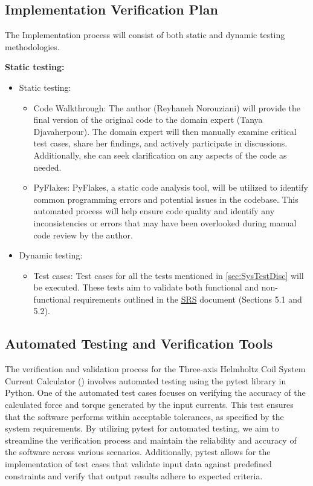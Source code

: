 \documentclass[12pt, titlepage]{article}
\begin{document}
\subsection{Implementation Verification Plan}

The Implementation process will consist of both static and dynamic testing methodologies.

\textbf{Static testing:}
\begin{itemize}

\item Static testing:
\begin{itemize}
\item Code Walkthrough: The author (Reyhaneh Norouziani) will provide the final version of the original code to the domain expert (Tanya Djavaherpour). The domain expert will then manually examine critical test cases, share her findings, and actively participate in discussions. Additionally, she can seek clarification on any aspects of the code as needed.
\item PyFlakes: PyFlakes, a static code analysis tool, will be utilized to identify common programming errors and potential issues in the \progname{} codebase. This automated process will help ensure code quality and identify any inconsistencies or errors that may have been overlooked during manual code review by the author.
\end{itemize}
\end{itemize}

\begin{itemize}
\item Dynamic testing:
\begin{itemize}

\item Test cases: Test cases for all the tests mentioned in \autoref{sec:SysTestDisc} will be executed. These tests aim to validate both functional and non-functional requirements outlined in the \href{https://github.com/rnorouziani/Helmholtz-Coil-Current-Calculator-CAS741/blob/main/docs/SRS/SRS.pdf}{SRS} document (Sections 5.1 and 5.2).
\end{itemize}
\end{itemize}
\subsection{Automated Testing and Verification Tools}
The verification and validation process for the Three-axis Helmholtz Coil System Current Calculator (\progname{}) involves automated testing using the pytest library in Python. One of the automated test cases focuses on verifying the accuracy of the calculated force and torque generated by the input currents. This test ensures that the software performs within acceptable tolerances, as specified by the system requirements. By utilizing pytest for automated testing, we aim to streamline the verification process and maintain the reliability and accuracy of the software across various scenarios. Additionally, pytest allows for the implementation of test cases that validate input data against predefined constraints and verify that output results adhere to expected criteria.
\end{document}
